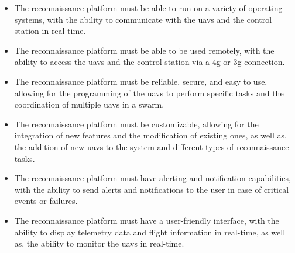 \begin{itemize}
  \item The reconnaissance platform must be able to run on a variety of operating systems, with the ability to communicate with the \glspl{uav} and the control station in real-time.

  \item The reconnaissance platform must be able to be used remotely, with the ability to access the \glspl{uav} and the control station via a \gls{4g} or \gls{3g} connection.

  \item The reconnaissance platform must be reliable, secure, and easy to use, allowing for the programming of the \glspl{uav} to perform specific tasks and the coordination of multiple \glspl{uav} in a swarm.

  \item The reconnaissance platform must be customizable, allowing for the integration of new features and the modification of existing ones, as well as, the addition of new \glspl{uav} to the system and different types of reconnaissance tasks.

  \item The reconnaissance platform must have alerting and notification capabilities, with the ability to send alerts and notifications to the user in case of critical events or failures.

  \item The reconnaissance platform must have a user-friendly interface, with the ability to display telemetry data and flight information in real-time, as well as, the ability to monitor the \glspl{uav} in real-time.
\end{itemize}

